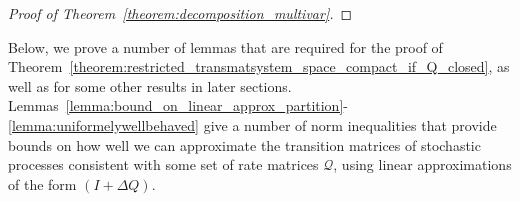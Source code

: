 \documentclass[10pt,a4paper]{paper}
\theoremstyle{definition}
\newcommand{\processes}{\mathbb{P}}
\newcommand{\wprocesses}{\processes^{\mathrm{W}}}
\newcommand{\rateset}{\mathcal{Q}}
\newcommand{\norm}[1]{\left\lVert #1 \right\rVert}
\begin{document}
\begin{proof}[Proof of Theorem~\ref{theorem:decomposition_multivar}]
\end{proof}

Below, we prove a number of lemmas that are required for the proof of Theorem~\ref{theorem:restricted_transmatsystem_space_compact_if_Q_closed}, as well as for some other results in later sections. Lemmas~\ref{lemma:bound_on_linear_approx_partition}-\ref{lemma:uniformelywellbehaved} give a number of norm inequalities that provide bounds on how well we can approximate the transition matrices of stochastic processes consistent with some set of rate matrices $\rateset$, using linear approximations of the form $(I+\Delta Q)$.
\end{document}
